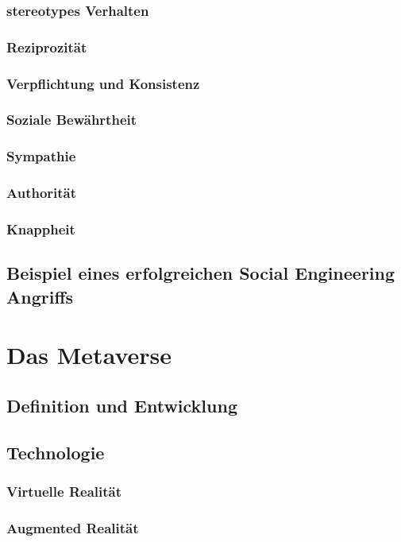 \subsubsection{stereotypes Verhalten}
\subsubsection{Reziprozität}
\subsubsection{Verpflichtung und Konsistenz}
\subsubsection{Soziale Bewährtheit}
\subsubsection{Sympathie}
\subsubsection{Authorität}
\subsubsection{Knappheit}



\subsection{Beispiel eines erfolgreichen Social Engineering Angriffs}

\section{Das Metaverse}

\subsection{Definition und Entwicklung} %
\subsection{Technologie}

\subsubsection{Virtuelle Realität}
\subsubsection{Augmented Realität}
